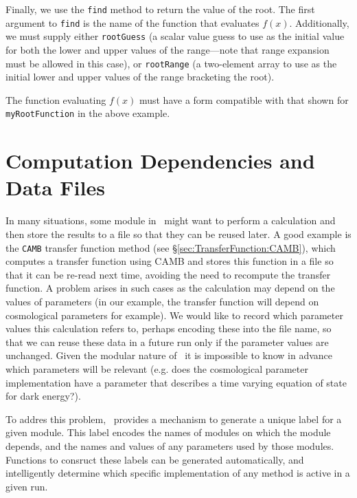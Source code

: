 Finally, we use the {\tt find} method to return the value of the root. The first argument to {\tt find} is the name of the function that evaluates $f(x)$. Additionally, we must supply either {\tt rootGuess} (a scalar value guess to use as the initial value for both the lower and upper values of the range---note that range expansion must be allowed in this case), or {\tt rootRange} (a two-element array to use as the initial lower and upper values of the range bracketing the root).

The function evaluating $f(x)$ must have a form compatible with that shown for {\tt myRootFunction} in the above example.

\section{Computation Dependencies and Data Files}

In many situations, some module in \glc\ might want to perform a calculation and then store the results to a file so that they can be reused later. A good example is the {\tt CAMB} transfer function method (see \S\ref{sec:TransferFunction:CAMB}), which computes a transfer function using {\sc CAMB} and stores this function in a file so that it can be re-read next time, avoiding the need to recompute the transfer function. A problem arises in such cases as the calculation may depend on the values of parameters (in our example, the transfer function will depend on cosmological parameters for example). We would like to record which parameter values this calculation refers to, perhaps encoding these into the file name, so that we can reuse these data in a future run only if the parameter values are unchanged. Given the modular nature of \glc\ it is impossible to know in advance which parameters will be relevant (e.g. does the cosmological parameter implementation have a parameter that describes a time varying equation of state for dark energy?). 

To addres this problem, \glc\ provides a mechanism to generate a unique label for a given module. This label encodes the names of modules on which the module depends, and the names and values of any parameters used by those modules. Functions to consruct these labels can be generated automatically, and intelligently determine which specific implementation of any method is active in a given run.

